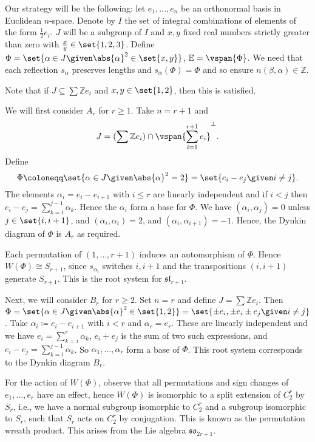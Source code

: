 Our strategy will be the following: let $e_1, \ldots, e_n$ be an
orthonormal basis in Euclidean $n$-space. Denote by $I$ the set of integral
combinations of elements of the form $\frac{1}{2}e_i$.
$J$ will be a subgroup of $I$ and $x, y$ fixed real numbers strictly greater than
zero with $\frac{x}{y} \in \set{1, 2, 3}$. Define
$\Phi = \set{\alpha \in J\given \abs{\alpha}^2 \in \set{x, y}}$, $\mathbb{E} = \vspan{\Phi}$.
We need that each reflection $s_\alpha$ preserves lengths and $s_\alpha(\Phi) = \Phi$
and so ensure $n(\beta, \alpha) \in \mathbb{Z}$.

Note that if $J \subseteq \sum \mathbb{Z}e_i$ and $x, y \in \set{1, 2}$, then this is
satisfied.

We will first consider $A_r$ for $r\geq 1$. Take $n = r + 1$ and
\[ J = (\sum \mathbb{Z}e_i)\cap \vspan{\sum_{i=1}^{r+1} e_i}^\perp. \]
Define \[\Phi\coloneqq \set{\alpha \in J\given \abs{\alpha}^2 = 2} = \set{e_i - e_j\given i\neq j}. \]
The elements $\alpha_i = e_i - e_{i+1}$ with $i \leq r$ are linearly independent
and if $i < j$ then $e_i - e_j = \sum_{k=i}^{j-1}\alpha_k$. Hence
the $\alpha_i$ form a base for $\Phi$. We have $(\alpha_i, \alpha_j) = 0$ unless
$j \in \set{i, i+1}$, and $(\alpha_i, \alpha_i) = 2$, and
$(\alpha_i, \alpha_{i+1}) = -1$. Hence, the Dynkin diagram of $\Phi$ is
$A_r$ as required.

Each permutation of $(1, \ldots, r+1)$ induces an automorphism of $\Phi$. Hence
$W(\Phi) \cong S_{r+1}$, since $s_{\alpha_i}$ switches $i, i+1$ and the
transpositions $(i, i+1)$ generate $S_{r+1}$. This is the root system for
$\mathfrak{sl}_{r+1}$.

Next, we will consider $B_r$ for $r\geq 2$. Set $n = r$ and define
$J = \sum \mathbb{Z}e_i$.
Then $\Phi = \set{\alpha \in J\given \abs{\alpha}^2 \in \set{1, 2}} = \set{\pm e_i, \pm e_i\pm e_j\given i\neq j}$.
Take $\alpha_i\coloneqq e_i - e_{i+1}$ with $i < r$ and $\alpha_r = e_r$. These
are linearly independent and we have $e_i = \sum_{k=i}^r \alpha_k$,
$e_i + e_j$ is the sum of two such expressions, and $e_i - e_j = \sum_{k=i}^{j-1}\alpha_k$.
So $\alpha_1, \ldots, \alpha_r$ form a base of $\Phi$. This root system corresponds
to the Dynkin diagram $B_r$.

For the action of $W(\Phi)$, observe that all
permutations and sign changes of $e_1, \ldots, e_r$ have an effect, hence
$W(\Phi)$ is isomorphic to a split extension of $C_2^r$ by $S_r$, i.e., we
have a normal subgroup isomorphic to $C_2^r$ and a subgroup isomorphic to
$S_r$, such that $S_r$ acts on $C_2^r$ by conjugation. This is known as the
permutation wreath product. This arises from the Lie algebra $\mathfrak{so}_{2r+1}$.

